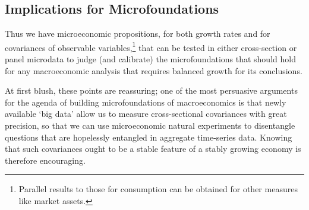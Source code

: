 \documentclass[BufferStockTheory]{subfiles}
\begin{document}
\begin{comment}
  which is the point where $\HarmWide{\cov}_{t}$ is the covariance calculated according to the Harmenberg measure.

  As Harmenberg points out, a convenient feature of his measure is that $\Harm{\Mean}_{t+n}[\PermLvl_{t+n}]=\PermGroFac^{n}$.  Using this, if by date $t=0$ the economy had achieved a Harmenberg-invariant state then we could define $\cNrmAvg=\Harm{\Mean}_{t}[\cNrm_ {t}]$ and use the fact that thereafter assets grow at the constant rate $\PermGroFac$ to obtain
  \begin{equation}
    \begin{split}\label{eq:covProblem}
      \CLvl_{t+1} & = \PermGroFac \CLvl_{t}\notag \\
      \cNrmAvg\PermGroFac +\HarmWide{\cov}(\cNrm_{t+1},\PermLvl_{t+1})   & = \PermGroFac \left( \cNrmAvg    +  \HarmWide{\cov}(\cNrm_{t},\PermLvl_{t})\right)
      \\  \HarmWide{\cov}(\cNrm_{t+1},\PermLvl_{t+1})   & = \HarmWide{\cov}(\cNrm_{t},\PermLvl_{t})  \notag
    \end{split}
  \end{equation}

  A corresponding argument shows that $\cov(\mNrm,\PermLvl)$ also grows by $\PermGroFac$.
\end{comment}


\hypertarget{microfounding-macro-needs-ergodicity}{}
\subsection{Implications for Microfoundations}\label{subsec:microfoundations}

Thus we have microeconomic propositions, for both growth rates and for covariances of observable variables,\footnote{Parallel results to those for consumption can be obtained for other measures like market assets.} that can be tested in either cross-section or panel microdata to judge (and calibrate) the microfoundations that should hold for any macroeconomic analysis that requires balanced growth for its conclusions.

At first blush, these points are reassuring; one of the most persuasive arguments for the agenda of building microfoundations of macroeconomics is that newly available `big data' allow us to measure cross-sectional covariances with great precision, so that we can use microeconomic natural experiments to disentangle questions that are hopelessly entangled in aggregate time-series data.  Knowing that such covariances ought to be a stable feature of a stably growing economy is therefore encouraging.
\end{document}
